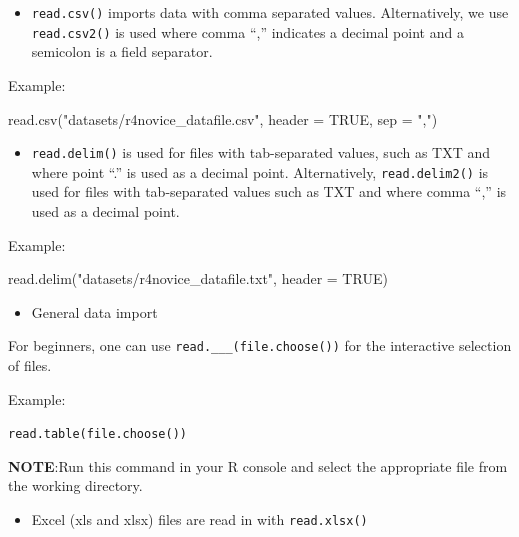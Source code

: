 \documentclass[
  letterpaper,
  DIV=11,
  numbers=noendperiod]{scrreprt}
\newenvironment{Shaded}{}{}
\newcommand{\AttributeTok}[1]{\textcolor[rgb]{0.84,0.23,0.29}{#1}}
\newcommand{\ConstantTok}[1]{\textcolor[rgb]{0.00,0.36,0.77}{#1}}
\newcommand{\FunctionTok}[1]{\textcolor[rgb]{0.44,0.26,0.76}{#1}}
\newcommand{\NormalTok}[1]{\textcolor[rgb]{0.14,0.16,0.18}{#1}}
\newcommand{\StringTok}[1]{\textcolor[rgb]{0.01,0.18,0.38}{#1}}
\providecommand{\tightlist}{%
  \setlength{\itemsep}{0pt}\setlength{\parskip}{0pt}}\usepackage{longtable,booktabs,array}
\begin{document}
\begin{itemize}
\tightlist
\item
  \texttt{read.csv()} imports data with comma separated values.
  Alternatively, we use \texttt{read.csv2()} is used where comma ``,''
  indicates a decimal point and a semicolon is a field separator.
\end{itemize}

Example:

\begin{Shaded}
\begin{Highlighting}[]
\FunctionTok{read.csv}\NormalTok{(}\StringTok{"datasets/r4novice\_datafile.csv"}\NormalTok{, }\AttributeTok{header =} \ConstantTok{TRUE}\NormalTok{, }\AttributeTok{sep =} \StringTok{","}\NormalTok{)}
\end{Highlighting}
\end{Shaded}

\begin{itemize}
\tightlist
\item
  \texttt{read.delim()} is used for files with tab-separated values,
  such as TXT and where point ``.'' is used as a decimal point.
  Alternatively, \texttt{read.delim2()} is used for files with
  tab-separated values such as TXT and where comma ``,'' is used as a
  decimal point.
\end{itemize}

Example:

\begin{Shaded}
\begin{Highlighting}[]
\FunctionTok{read.delim}\NormalTok{(}\StringTok{"datasets/r4novice\_datafile.txt"}\NormalTok{, }\AttributeTok{header =} \ConstantTok{TRUE}\NormalTok{)}
\end{Highlighting}
\end{Shaded}

\begin{itemize}
\tightlist
\item
  General data import
\end{itemize}

For beginners, one can use \texttt{read.\_\_\_(file.choose())} for the
interactive selection of files.

Example:

\texttt{read.table(file.choose())}

\textbf{NOTE}:Run this command in your R console and select the
appropriate file from the working directory.

\begin{itemize}
\tightlist
\item
  Excel (xls and xlsx) files are read in with \texttt{read.xlsx()}
\end{itemize}
\end{document}
